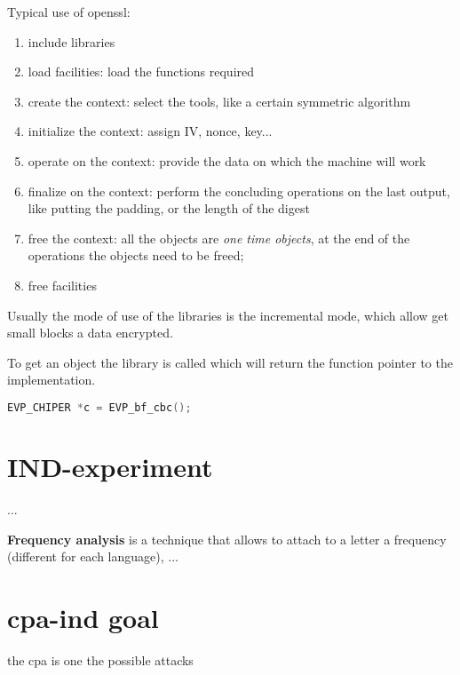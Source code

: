 \documentclass[12pt]{article}
\begin{document}
Typical use of openssl:
\begin{enumerate}
  \item include libraries
  \item load facilities: load the functions required
  \item create the context: select the tools, like a certain symmetric algorithm
  \item initialize the context: assign IV, nonce, key...
  \item operate on the context: provide the data on which the machine will work
  \item finalize on the context: perform the concluding operations on the last output, like putting the padding, or the length of the digest
  \item free the context: all the objects are \emph{one time objects}, at the end of the operations the objects need to be freed;
  \item free facilities
\end{enumerate}
Usually the mode of use of the libraries is the incremental mode, which allow get small blocks a data encrypted.

To get an object the library is called which will return the function pointer to the implementation.
\begin{lstlisting}[language=c]
EVP_CHIPER *c = EVP_bf_cbc();
\end{lstlisting}




\section{IND-experiment}
...


\textbf{Frequency analysis} is a technique that allows to attach to a letter a frequency (different for each language), ...


\section{cpa-ind goal}
the cpa is one the possible attacks
\end{document}
